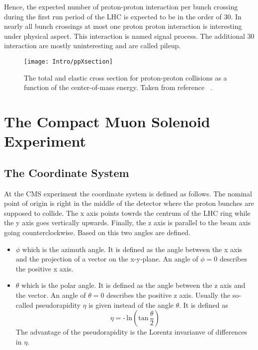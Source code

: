 Hence, the expected number of proton-proton interaction per bunch crossing during the first run period of the LHC is expected to be in the order of 30. In nearly all bunch crossings at most one proton proton interaction is interesting under physical aspect. This interaction is named signal process. The additional 30 interaction are mostly uninteresting and are called pileup.

\begin{figure}[!Hhtb]
    \centering
    \texttt{[image: Intro/ppXsection]}
    \caption[Total and elastic cross section for pp interactions]{The total and elastic cross section for proton-proton collisions as a function of the center-of-mass energy. Taken from reference ~.\label{plot:IntroTotalCross}}
\end{figure}

\section{The Compact Muon Solenoid Experiment \label{LHCCMSCMS}}

\subsection{The Coordinate System \label{LCHCMSCoordSys}}

At the CMS experiment the coordinate system is defined as follows. The nominal point of origin is right in the middle of the detector where the proton bunches are supposed to collide. The x axis points towrds the centrum of the LHC ring while the y axis goes vertically upwards. Finally, the z axis is parallel to the beam axis going counterclockwise. Based on this two angles are defined.
\begin{itemize}
    \item{$\phi{}$} which is the azimuth angle. It is defined as the angle between the x axis and the projection of a vector on the x-y-plane. An angle of $\phi{} = 0$ describes the positive x axis.
    \item{$\theta{}$} which is the polar angle. It is defined as the angle between the z axis and the vector. An angle of $\theta{} = 0$ describes the positive z axis. Usually the so-called pseudorapidity $\eta{}$ is given instead of the angle $\theta$. It is defined as
    \begin{equation}
        \eta{} = \textrm{-}\,{}\textrm{ln} \left( \textrm{tan}\,{}\frac{\theta{}}{2}\right)
        \label{eq:pseudorapidity}
    \end{equation}
    The advantage of the pseudorapidity is the Lorentz invarianve of differences in $\eta{}$.
\end{itemize}

